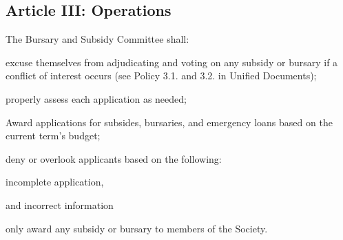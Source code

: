 \subsection{Article III: Operations}
\begin{longenum}[ label*=\thesubsection.\arabic*., align=left] 
	\item The Bursary and Subsidy Committee shall:	
		\begin{longenum}[ label*=\arabic*., align=left] 
		\item excuse themselves from adjudicating and voting on any subsidy or bursary if a conflict of interest occurs (see Policy 3.1. and 3.2. in Unified Documents);
		\item properly assess each application as needed;
		\item Award applications for subsides, bursaries, and emergency loans based on the current term’s budget;
		\item deny or overlook applicants based on the following:
			\begin{longenum}[ label*=\arabic*., align=left]
			\item incomplete application,
			\item and incorrect information
			\end{longenum}
		\item only award any subsidy or bursary to members of the Society.	
		\end{longenum}
\end{longenum}

